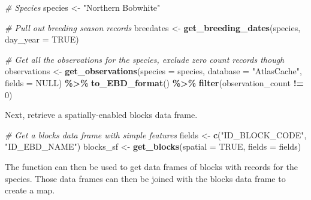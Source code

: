 \documentclass[
]{article}
\newenvironment{Shaded}{\begin{snugshade}}{\end{snugshade}}
\newcommand{\AttributeTok}[1]{\textcolor[rgb]{0.13,0.29,0.53}{#1}}
\newcommand{\CommentTok}[1]{\textcolor[rgb]{0.56,0.35,0.01}{\textit{#1}}}
\newcommand{\ConstantTok}[1]{\textcolor[rgb]{0.56,0.35,0.01}{#1}}
\newcommand{\DecValTok}[1]{\textcolor[rgb]{0.00,0.00,0.81}{#1}}
\newcommand{\FunctionTok}[1]{\textcolor[rgb]{0.13,0.29,0.53}{\textbf{#1}}}
\newcommand{\NormalTok}[1]{#1}
\newcommand{\OtherTok}[1]{\textcolor[rgb]{0.56,0.35,0.01}{#1}}
\newcommand{\SpecialCharTok}[1]{\textcolor[rgb]{0.81,0.36,0.00}{\textbf{#1}}}
\newcommand{\StringTok}[1]{\textcolor[rgb]{0.31,0.60,0.02}{#1}}
\begin{document}
\begin{Shaded}
\begin{Highlighting}[]
\CommentTok{\# Species}
\NormalTok{species }\OtherTok{\textless{}{-}} \StringTok{"Northern Bobwhite"}

\CommentTok{\# Pull out breeding season records}
\NormalTok{breedates }\OtherTok{\textless{}{-}} \FunctionTok{get\_breeding\_dates}\NormalTok{(species, }\AttributeTok{day\_year =} \ConstantTok{TRUE}\NormalTok{)}

\CommentTok{\# Get all the observations for the species, exclude zero count records though}
\NormalTok{observations }\OtherTok{\textless{}{-}} \FunctionTok{get\_observations}\NormalTok{(}\AttributeTok{species =}\NormalTok{ species, }
                        \AttributeTok{database =} \StringTok{"AtlasCache"}\NormalTok{, }
                        \AttributeTok{fields =} \ConstantTok{NULL}\NormalTok{) }\SpecialCharTok{\%\textgreater{}\%}
  \FunctionTok{to\_EBD\_format}\NormalTok{() }\SpecialCharTok{\%\textgreater{}\%}
  \FunctionTok{filter}\NormalTok{(observation\_count }\SpecialCharTok{!=} \DecValTok{0}\NormalTok{)}
\end{Highlighting}
\end{Shaded}

Next, retrieve a spatially-enabled blocks data frame.

\begin{Shaded}
\begin{Highlighting}[]
\CommentTok{\# Get a blocks data frame with simple features}
\NormalTok{fields }\OtherTok{\textless{}{-}} \FunctionTok{c}\NormalTok{(}\StringTok{"ID\_BLOCK\_CODE"}\NormalTok{, }\StringTok{"ID\_EBD\_NAME"}\NormalTok{)}
\NormalTok{blocks\_sf }\OtherTok{\textless{}{-}} \FunctionTok{get\_blocks}\NormalTok{(}\AttributeTok{spatial =} \ConstantTok{TRUE}\NormalTok{, }\AttributeTok{fields =}\NormalTok{ fields)}
\end{Highlighting}
\end{Shaded}

The function can then be used to get data frames of blocks with records
for the species. Those data frames can then be joined with the blocks
data frame to create a map.
\end{document}

